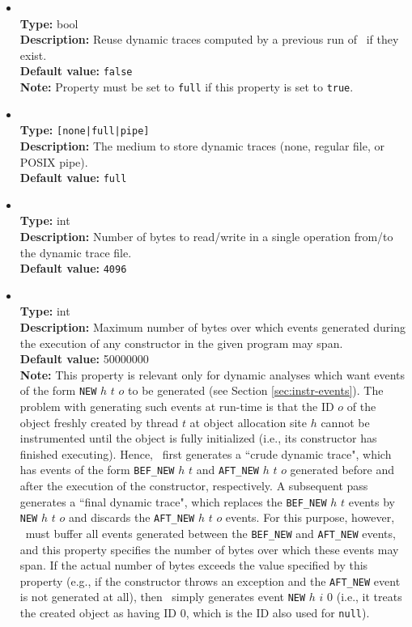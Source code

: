 \begin{itemize}
\item
{} \\
{\bf Type:} bool \\
{\bf Description:} Reuse dynamic traces computed by a previous run of \Chord\ if they exist. \\
{\bf Default value:} {\tt false} \\
{\bf Note:} Property  must be set to {\tt full} if this property is set to {\tt true}.

\item
{} \\
{\bf Type:} {\tt [none|full|pipe]} \\
{\bf Description:} The medium to store dynamic traces (none, regular file, or POSIX pipe). \\
{\bf Default value:} {\tt full} 

\item
{} \\
{\bf Type:} int \\
{\bf Description:} Number of bytes to read/write in a single operation from/to the dynamic trace file. \\
{\bf Default value:} {\tt 4096} 

\item
{} \\
{\bf Type:} int \\
{\bf Description:} Maximum number of bytes over which events generated during the execution of any constructor in the given program may span. \\
{\bf Default value:} 50000000 \\
{\bf Note:} This property is relevant only for dynamic analyses which want events of the form {\tt NEW} $h$ $t$ $o$ to be generated (see Section \ref{sec:instr-events}).  The problem with generating such events at run-time is that the ID $o$ of the object freshly created by thread $t$ at object allocation site $h$ cannot be instrumented until the object is fully initialized (i.e., its constructor has finished executing).  Hence, \Chord\ first generates a ``crude dynamic trace", which has events of the form {\tt BEF\_NEW} $h$ $t$ and {\tt AFT\_NEW} $h$ $t$ $o$ generated before and after the execution of the constructor, respectively.  A subsequent pass generates a ``final dynamic trace", which replaces the {\tt BEF\_NEW} $h$ $t$ events by {\tt NEW} $h$ $t$ $o$ and discards the {\tt AFT\_NEW} $h$ $t$ $o$ events.  For this purpose, however, \Chord\ must buffer all events generated between the {\tt BEF\_NEW} and {\tt AFT\_NEW} events, and this property specifies the number of bytes over which these events may span.  If the actual number of bytes exceeds the value specified by this property (e.g., if the constructor throws an exception and the {\tt AFT\_NEW} event is not generated at all), then \Chord\ simply generates event {\tt NEW} $h$ $i$ $0$ (i.e., it treats the created object as having ID 0, which is the ID also used for {\tt null}).


\end{itemize}
